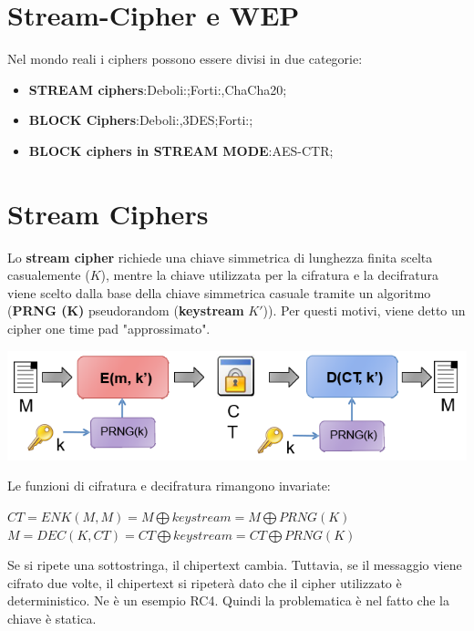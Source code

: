 \documentclass{book}
\theoremstyle{remark}
\begin{document}
\chapter{Stream-Cipher e WEP}
Nel mondo reali i ciphers possono essere divisi in due categorie:\begin{itemize}
	\item \textbf{STREAM ciphers}:\@\newline Deboli:\@RCA;\@\newline Forti:,ChaCha20;\@
	\item \textbf{BLOCK Ciphers}:\@\newline Deboli:\@DES,3DES;\@\newline Forti:\@AES\@;\@
	\item \textbf{BLOCK ciphers in STREAM MODE}:\@\newline AES-CTR\@;\@
\end{itemize}
\chapter{Stream Ciphers}
Lo \textbf{stream cipher} richiede una chiave simmetrica di lunghezza finita scelta casualemente (\(K\)), mentre la chiave utilizzata per la cifratura e la decifratura viene scelto dalla base della chiave simmetrica casuale tramite un algoritmo (\textbf{PRNG (K)} pseudorandom (\textbf{keystream} \(K'\)))\@. Per questi motivi, viene detto un cipher one time pad "approssimato"\@.
\begin{center}
	\includegraphics[scale=0.5]{Stream Cipher}
\end{center}
Le funzioni di cifratura e decifratura rimangono invariate:
\begin{center}
	\(CT= ENK(M,M)=M \bigoplus keystream = M \bigoplus PRNG(K)\)
	\(M = DEC(K,CT) = CT \bigoplus keystream = CT \bigoplus PRNG(K)\)
\end{center}
Se si ripete una sottostringa, il chipertext cambia\@. Tuttavia, se il messaggio viene cifrato due volte, il chipertext si ripeterà dato che il cipher utilizzato è deterministico\@. Ne è un esempio RC4\@.\newline
Quindi la problematica è nel fatto che la chiave è statica\@.
\end{document}
